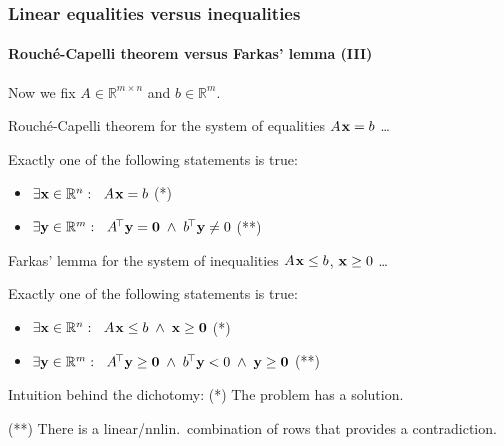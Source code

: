 \documentclass{beamer}
\renewcommand{\.}{\hskip .75pt}
\DeclareMathOperator{\aand}{~\wedge~}
\begin{document}
\begin{frame}
\frametitle{Linear equalities versus inequalities}
\framesubtitle{Rouché-Capelli theorem versus Farkas' lemma (III)}

	Now we fix $A \in \mathbb{R}^{m \times n}$ and $b \in \mathbb{R}^{m}$.
	\bigskip
	
	{ \color{dred}
		Rouché-Capelli theorem for the system of equalities $A\. \bold{x} = b$ \dots
		
		Exactly one of the following statements is true:
	}
	\begin{itemize} \color{dred}
		\item $\exists \bold{x} \in \mathbb{R}^{n} : \ \; A\. \bold{x} = b$ \hfill\hbox{\footnotesize(*)\:\qquad}
		\item $\exists \bold{y} \in \mathbb{R}^{m} : \ \; A^{\!\top} \bold{y} = \bold{0} \aand b^{\!\top} \bold{y} \neq 0$ \hfill\hbox{\footnotesize(**)\qquad}
	\end{itemize}
	\medskip
	
	{ \color{dblue}
		Farkas' lemma for the system of inequalities $A\. \bold{x} \le b$, $\bold{x} \ge 0$ \dots
		
		Exactly one of the following statements is true:
	}
	\begin{itemize} \color{dblue}
		\item $\exists \bold{x} \in \mathbb{R}^{n} : \ \; A\. \bold{x} \le b \aand \bold{x} \ge \bold{0}$ \hfill\hbox{\footnotesize(*)\:\qquad}
		\item $\exists \bold{y} \in \mathbb{R}^{m} : \ \; A^{\!\top} \bold{y} \ge \bold{0} \aand b^{\!\top} \bold{y} < 0 \aand \bold{y} \ge \bold{0}$ \hfill\hbox{\footnotesize(**)\qquad}
	\end{itemize}
	\medskip
	
	\footnotesize Intuition behind the dichotomy:\qquad
	(*) The problem has a solution.
	
	(**) There is a linear/nnlin.~combination of rows that provides a contradiction.

\end{frame}
\end{document}
